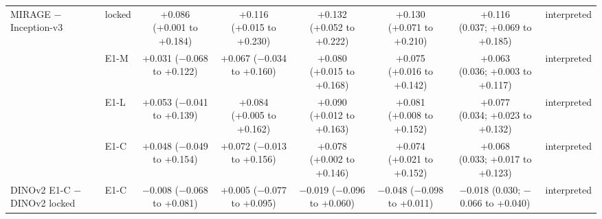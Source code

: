 \begin{longtable}{@{}p{3.6cm}lcccccp{2.6cm}@{}}
\addlinespace[2pt]
MIRAGE $-$ Inception-v3 & locked & \makecell{+0.086\\{\scriptsize (+0.001 to +0.184)}} & \makecell{+0.116\\{\scriptsize (+0.015 to +0.230)}} & \makecell{+0.132\\{\scriptsize (+0.052 to +0.222)}} & \makecell{+0.130\\{\scriptsize (+0.071 to +0.210)}} & \makecell{+0.116\\{\scriptsize (0.037; +0.069 to +0.185)}} & interpreted \\
 & E1-M & \makecell{+0.031\\{\scriptsize ($-$0.068 to +0.122)}} & \makecell{+0.067\\{\scriptsize ($-$0.034 to +0.160)}} & \makecell{+0.080\\{\scriptsize (+0.015 to +0.168)}} & \makecell{+0.075\\{\scriptsize (+0.016 to +0.142)}} & \makecell{+0.063\\{\scriptsize (0.036; +0.003 to +0.117)}} & interpreted \\
 & E1-L & \makecell{+0.053\\{\scriptsize ($-$0.041 to +0.139)}} & \makecell{+0.084\\{\scriptsize (+0.005 to +0.162)}} & \makecell{+0.090\\{\scriptsize (+0.012 to +0.163)}} & \makecell{+0.081\\{\scriptsize (+0.008 to +0.152)}} & \makecell{+0.077\\{\scriptsize (0.034; +0.023 to +0.132)}} & interpreted \\
 & E1-C & \makecell{+0.048\\{\scriptsize ($-$0.049 to +0.154)}} & \makecell{+0.072\\{\scriptsize ($-$0.013 to +0.156)}} & \makecell{+0.078\\{\scriptsize (+0.002 to +0.146)}} & \makecell{+0.074\\{\scriptsize (+0.021 to +0.152)}} & \makecell{+0.068\\{\scriptsize (0.033; +0.017 to +0.123)}} & interpreted \\
\addlinespace[2pt]
DINOv2 E1-C $-$ DINOv2 locked & E1-C & \makecell{$-$0.008\\{\scriptsize ($-$0.068 to +0.081)}} & \makecell{+0.005\\{\scriptsize ($-$0.077 to +0.095)}} & \makecell{$-$0.019\\{\scriptsize ($-$0.096 to +0.060)}} & \makecell{$-$0.048\\{\scriptsize ($-$0.098 to +0.011)}} & \makecell{$-$0.018\\{\scriptsize (0.030; $-$0.066 to +0.040)}} & interpreted \\

\end{longtable}

